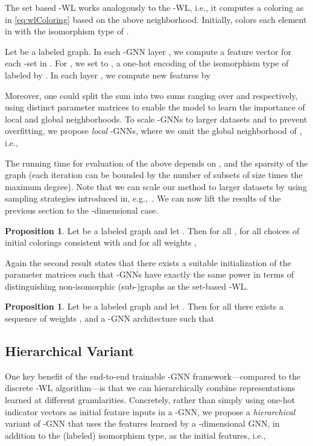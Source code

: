 \documentclass[letterpaper]{article}
\theoremstyle{definition}
\newtheorem{proposition}[theorem]{Proposition}
\begin{document}
The set based -WL works analogously to the -WL, i.e., it computes a coloring  as in \cref{eq:wlColoring} based on the above neighborhood. 
Initially,  colors each element  in  with the isomorphism type of . 

Let  be a labeled graph. 
In each -GNN layer , we compute a feature vector  for each -set  in . 
For , we set   to  , a one-hot encoding  of the isomorphism type of  labeled by . In each layer ,  we compute new features by 

Moreover, one could split the sum into two sums ranging over  and  respectively, using distinct parameter matrices to enable the model to learn the importance of local and global neighborhoods. 
To scale -GNNs to larger datasets and to prevent overfitting, we propose \emph{local} -GNNs, where we omit the global neighborhood of  , i.e.,

The running time for evaluation of the above depends on ,  and the sparsity of the graph (each iteration can be bounded by the number of subsets of size  times the maximum degree). Note that we can scale our method to larger datasets by using sampling strategies introduced in, e.g.,~\cite{Mor+2017,Ham+2017}. We can now lift the results of the previous section to the -dimensional case. 
\begin{proposition}\label{pro:refines}
	Let  be a labeled graph and let . Then for all , for all choices of initial colorings  consistent with  and for all weights ,
	
\end{proposition}
Again the second result states that there exists a suitable initialization of the parameter matrices  such that -GNNs have exactly the same power in terms of distinguishing non-isomorphic (sub-)graphs as the set-based -WL.
\begin{proposition}\label{pro:equality}
	Let  be a labeled graph and let . Then for all  there exists a sequence of weights , and a -GNN architecture such that   
			
\end{proposition}


\subsection{Hierarchical Variant}

One key benefit of the end-to-end trainable -GNN frame\-work---compared to the discrete -WL algorithm---is that we can hierarchically combine representations learned at different granularities.
Concretely, rather than simply using one-hot indicator vectors as initial feature inputs in a -GNN, we propose a \emph{hierarchical} variant of -GNN that uses the features learned by a -dimensional GNN, in addition to the (labeled) isomorphism type, as the initial features, i.e.,
\end{document}
